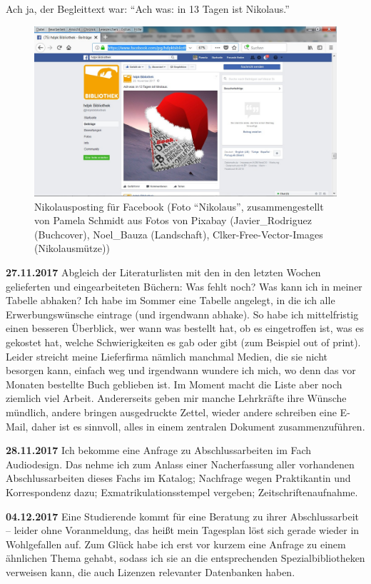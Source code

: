 \documentclass[a4paper,
fontsize=11pt,
oneside,
numbers=noperiodatend,
parskip=half-,
bibliography=totoc,
final
]{scrartcl}
\begin{document}
Ach ja, der Begleittext war: \enquote{Ach was: in 13 Tagen ist
Nikolaus.}

\begin{figure}
\centering
\includegraphics{img/Schmidt_3_b.jpg}
\caption{Nikolausposting für Facebook (Foto \enquote{Nikolaus},
zusammengestellt von Pamela Schmidt aus Fotos von Pixabay
(Javier\_Rodriguez (Buchcover), Noel\_Bauza (Landschaft),
Clker-Free-Vector-Images (Nikolausmütze))}
\end{figure}

\textbf{27.11.2017} Abgleich der Literaturlisten mit den in den letzten
Wochen gelieferten und eingearbeiteten Büchern: Was fehlt noch? Was kann
ich in meiner Tabelle abhaken? Ich habe im Sommer eine Tabelle angelegt,
in die ich alle Erwerbungswünsche eintrage (und irgendwann abhake). So
habe ich mittelfristig einen besseren Überblick, wer wann was bestellt
hat, ob es eingetroffen ist, was es gekostet hat, welche Schwierigkeiten
es gab oder gibt (zum Beispiel out of print). Leider streicht meine
Lieferfirma nämlich manchmal Medien, die sie nicht besorgen kann,
einfach weg und irgendwann wundere ich mich, wo denn das vor Monaten
bestellte Buch geblieben ist. Im Moment macht die Liste aber noch
ziemlich viel Arbeit. Andererseits geben mir manche Lehrkräfte ihre
Wünsche mündlich, andere bringen ausgedruckte Zettel, wieder andere
schreiben eine E-Mail, daher ist es sinnvoll, alles in einem zentralen
Dokument zusammenzuführen.

\textbf{28.11.2017} Ich bekomme eine Anfrage zu Abschlussarbeiten im
Fach Audiodesign. Das nehme ich zum Anlass einer Nacherfassung aller
vorhandenen Abschlussarbeiten dieses Fachs im Katalog; Nachfrage wegen
Praktikantin und Korrespondenz dazu; Exmatrikulationsstempel vergeben;
Zeitschriftenaufnahme.

\textbf{04.12.2017} Eine Studierende kommt für eine Beratung zu ihrer
Abschlussarbeit -- leider ohne Voranmeldung, das heißt mein Tagesplan
löst sich gerade wieder in Wohlgefallen auf. Zum Glück habe ich erst vor
kurzem eine Anfrage zu einem ähnlichen Thema gehabt, sodass ich sie an
die entsprechenden Spezialbibliotheken verweisen kann, die auch Lizenzen
relevanter Datenbanken haben.
\end{document}
